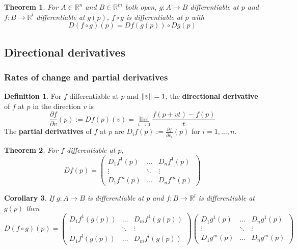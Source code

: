 \documentclass[12pt]{article}
\newtheorem{thm}{Theorem}[section]
\newtheorem{cor}[thm]{Corollary}
\theoremstyle{definition}
\newtheorem{defn}{Definition}[section]
\DeclarePairedDelimiter\length{\lVert}{\rVert}
\newcommand{\R}{\mathbb{R}}
\begin{document}
\begin{thm}
  For $A \in \R^n$ and $B \in \R^m$ both open, $g : A \to B$ differentiable at $p$ and $f : B \to \R^l$ differentiable at $g(p)$, $f \circ g$ is differentiable at $p$ with
  $$D(f \circ g)(p) = Df(g(p)) \circ Dg(p)$$
\end{thm}

\subsection{Directional derivatives}

\subsubsection{Rates of change and partial derivatives}

\begin{defn}
  For $f$ differentiable at $p$ and $\length{v} = 1$, the \textbf{directional derivative} of $f$ at $p$ in the direction $v$ is
  $$\frac{\partial f}{\partial v}(p) := Df(p)(v) = \lim_{t \to 0}\frac{f(p + vt) - f(p)}{t}$$
  The \textbf{partial derivatives} of $f$ at $p$ are $D_if(p) := \frac{\partial f}{\partial e_i}(p)$ for $i = 1, \ldots, n$.
\end{defn}

\begin{thm}
  For $f$ differentiable at $p$,
  $$Df(p) = \begin{pmatrix}
    D_1f^1(p) & \ldots & D_nf^1(p) \\
    \vdots    & \ddots & \vdots    \\
    D_1f^m(p) & \ldots & D_nf^m(p)
  \end{pmatrix}$$
\end{thm}

\begin{cor}
  If $g : A \to B$ is differentiable at $p$ and $f : B \to \R^l$ is differentiable at $g(p)$ then
  $$D(f \circ g)(p) = \begin{pmatrix}
    D_1f^1(g(p)) & \ldots & D_mf^1(g(p)) \\
    \vdots    & \ddots & \vdots    \\
    D_1f^l(g(p)) & \ldots & D_mf^l(g(p))
  \end{pmatrix}\begin{pmatrix}
    D_1g^1(p) & \ldots & D_ng^1(p) \\
    \vdots    & \ddots & \vdots    \\
    D_1g^m(p) & \ldots & D_ng^m(p)
  \end{pmatrix}$$
\end{cor}
\end{document}

